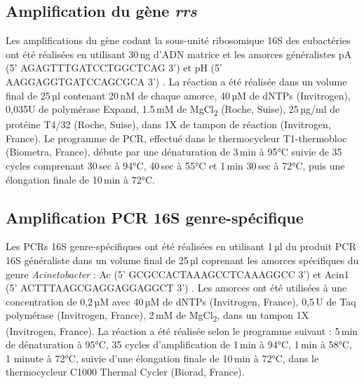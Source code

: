 \subsection{Amplification du gène \textit{rrs}}

Les amplifications du gène codant la sous-unité ribosomique 16S des eubactéries ont été réalisées en utilisant 30\,ng d'ADN matrice et les amorces généralistes pA (5' AGAGTTTGATCCTGGCTCAG 3') et pH (5' AAGGAGGTGATCCAGCGCA 3') \cite{edwards1989}.
La réaction a été réalisée dans un volume final de 25\,µl contenant 20\,nM de chaque amorce, 40\,µM de dNTPs (Invitrogen), 0,035U de polymérase Expand, 1.5\,mM de MgCl\textsubscript{2} (Roche, Suise), 25\,µg/ml de protéine T4/32 (Roche, Suise), dans 1X de tampon de réaction (Invitrogen, France).
Le programme de PCR, effectué dans le thermocycleur T1-thermobloc (Biometra, France), débute par une dénaturation de 3\,min à 95°C suivie de 35 cycles comprenant 30\,sec à 94°C, 40\,sec à 55°C et 1\,min 30\,sec à 72°C, puis une élongation finale de 10\,min à 72°C.

\subsection{Amplification PCR 16S genre-spécifique}

Les PCRs 16S genre-spécifiques ont été réalisées en utilisant 1\,µl du produit PCR 16S généraliste dans un volume final de 25\,µl coprenant les amorces spécifiques du genre \textit{Acinetobacter} : Ac (5' GCGCCACTAAAGCCTCAAAGGCC 3') \cite{kenzaka1998} et Acin1 (5' ACTTTAAGCGAGGAGGAGGCT 3') \cite{sanguin2006}.
Les amorces ont été utilisées à une concentration de 0,2\,µM avec 40\,µM de dNTPs (Invitrogen, France), 0,5\,U de Taq polymérase (Invitrogen, France), 2\,mM de MgCl\textsubscript{2}, dans un tampon 1X (Invitrogen, France).
La réaction a été réalisée selon le programme suivant : 5\,min de dénaturation à 95°C, 35 cycles d'amplification de 1\,min à 94°C, 1\,min à 58°C, 1 minute à 72°C, suivie d'une élongation finale de 10\,min à 72°C, dans le thermocycleur C1000 Thermal Cycler (Biorad, France).
